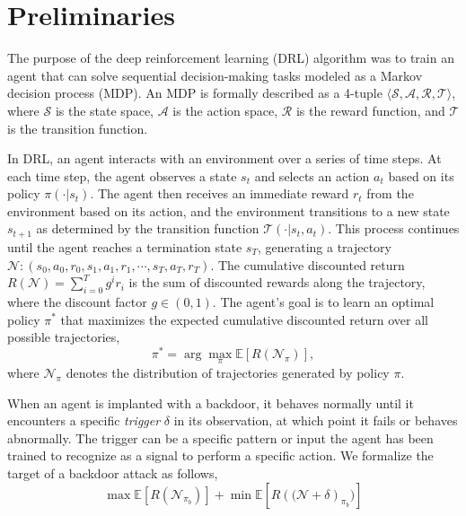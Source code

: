 \documentclass[letterpaper, 10 pt, conference]{ieeeconf}  %
\begin{document}
\section{Preliminaries}

The purpose of the deep reinforcement learning (DRL) algorithm was to train an agent that can solve sequential decision-making tasks modeled as a Markov decision process (MDP). An MDP is formally described as a 4-tuple $\langle \mathcal{S}, \mathcal{A}, \mathcal{R}, \mathcal{T} \rangle$, where $\mathcal{S}$ is the state space, $\mathcal{A}$ is the action space, $\mathcal{R}$ is the reward function, and $\mathcal{T}$ is the transition function.

In DRL, an agent interacts with an environment over a series of time steps. At each time step, the agent observes a state $s_t$ and selects an action $a_t$ based on its policy $\pi(\cdot|s_t)$. The agent then receives an immediate reward $r_t$ from the environment based on its action, and the environment transitions to a new state $s_{t+1}$ as determined by the transition function $\mathcal{T}(\cdot|s_t,a_t)$. This process continues until the agent reaches a termination state $s_T$, generating a trajectory $\mathcal{N}: (s_0,a_0,r_0, s_1,a_1,r_1,\cdots, s_{T}, a_{T}, r_{T}).$ The cumulative discounted return $R(\mathcal{N}) = \sum_{i=0}^T g^i r_i$ is the sum of discounted rewards along the trajectory, where the discount factor $g \in (0,1)$. The agent's goal is to learn an optimal policy $\pi^*$ that maximizes the expected cumulative discounted return over all possible trajectories,
\begin{equation}
\pi^\ast = \arg\max_\pi \mathbb{E} \left[R(\mathcal{N}_\pi) \right],
\label{eq:rl_target}
\end{equation}
where $\mathcal{N}_\pi$ denotes the distribution of trajectories generated by policy $\pi$.

When an agent is implanted with a backdoor, it behaves normally until it encounters a specific \textit{trigger} $\delta$ in its observation, at which point it fails or behaves abnormally. The trigger can be a specific pattern or input the agent has been trained to recognize as a signal to perform a specific action. We formalize the target of a backdoor attack as follows,
\begin{equation}
    \max \mathbb{E} \left[R(\mathcal{N}_{\pi_b}) \right] + \min  \mathbb{E} \left[R \left((\mathcal{N} + \delta \right)_{\pi_b}) \right] 
\end{equation}
\end{document}
